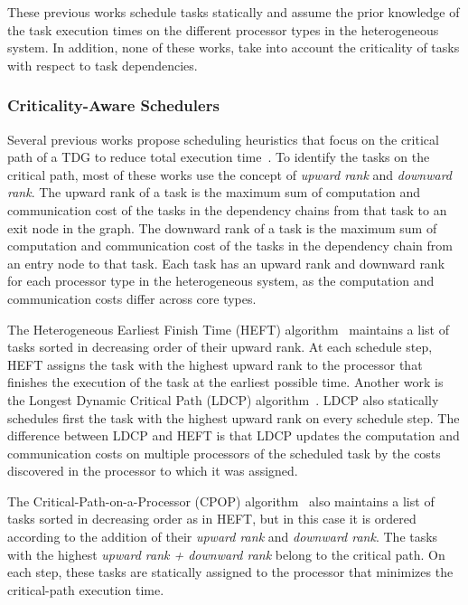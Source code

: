 These previous works schedule tasks statically and assume the prior knowledge of the task execution times on the different processor types in the heterogeneous system.
In addition, none of these works, take into account the criticality of tasks with respect to task dependencies.

\subsubsection{Criticality-Aware Schedulers}
\label{sec.relwork_critical}

Several previous works propose scheduling heuristics that focus on the critical path of a TDG to reduce total execution time~\cite{DCPS, LDCP, HEFT, CrPathDup, Moschakis2015}. To identify the tasks on the critical path, most of these works use the concept of \textit{upward rank} and \textit{downward rank}. The upward rank of a task is the maximum sum of computation and communication cost of the tasks in the dependency chains from that task to an exit node in the graph. The downward rank of a task is the maximum sum of computation and communication cost of the tasks in the dependency chain from an entry node to that task. Each task has an upward rank and downward rank for each processor type in the heterogeneous system, as the computation and communication costs differ across core types.

The Heterogeneous Earliest Finish Time (HEFT) algorithm~\cite{HEFT} maintains a list of tasks sorted in decreasing order of their upward rank. At each schedule step, HEFT assigns the task with the highest upward rank to the processor that finishes the execution of the task at the earliest possible time. Another work is the Longest Dynamic Critical Path (LDCP) algorithm~\cite{LDCP}. LDCP also statically schedules first the task with the highest upward rank on every schedule step. The difference between LDCP and HEFT is that LDCP updates the computation and communication costs on multiple processors of the scheduled task by the costs discovered in the processor to which it was assigned.

The Critical-Path-on-a-Processor (CPOP) algorithm~\cite{HEFT} also maintains a list of tasks sorted in decreasing order as in HEFT, but in this case it is ordered according to the addition of their \textit{upward rank} and \textit{downward rank}. The tasks with the highest \textit{upward rank + downward rank} belong to the critical path. On each step, these tasks are statically assigned to the processor that minimizes the critical-path execution time.


